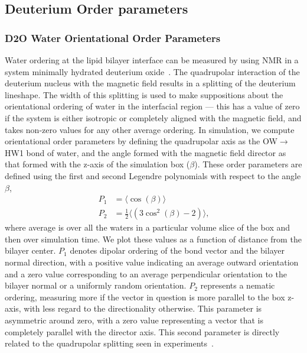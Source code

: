 \subsection{Deuterium Order parameters}
\subsubsection{D2O Water Orientational Order Parameters}
Water ordering at the lipid bilayer interface can be measured by using NMR in a system minimally hydrated deuterium oxide~\cite{aaman:2003}.
The quadrupolar interaction of the deuterium nucleus with the magnetic field results in a splitting of the deuterium lineshape. The width of this splitting 
is used to make suppositions about the orientational ordering of water in the interfacial region --- this has a value of zero if the system is either isotropic or completely aligned with the
magnetic field, and takes non-zero values for any other average ordering.
In simulation, we compute 
orientational order parameters by defining the quadrupolar axis as the
OW$\rightarrow$HW1 bond of water, and the angle formed with the magnetic field director 
as that formed with the z-axis of the simulation box ($\beta$). 
These order parameters are defined using the first and second 
Legendre polynomials with respect to the angle $\beta$,
\begin{equation}
    \begin{split}
    P_1&=\langle \cos\left(\beta\right) \rangle
    \\ P_2&=\frac{1}{2}\bigg\langle\left(3\cos^2\left(\beta\right)-2\right)\bigg\rangle
    \text{,} 
\end{split}
\end{equation}
where average is over all the waters in a particular volume slice of the box 
and then over simulation time.  
We plot these values as a function of distance from the bilayer center. 
$P_1$ denotes dipolar ordering of the bond vector and the bilayer normal direction, 
with a positive value indicating an average outward orientation 
and a zero value corresponding to an average perpendicular orientation to the
bilayer normal or a uniformly random orientation. 
$P_2$ represents a nematic ordering, measuring more if the vector in question is more parallel to the box z-axis, with less regard to the directionality otherwise. This parameter 
is asymmetric around zero, with a zero value representing a vector that is completely parallel with the director axis. This second parameter is directly related to the quadrupolar splitting 
seen in experiments~\cite{aaman:2003,kruczek:2017:ether,saunders:2019}.
